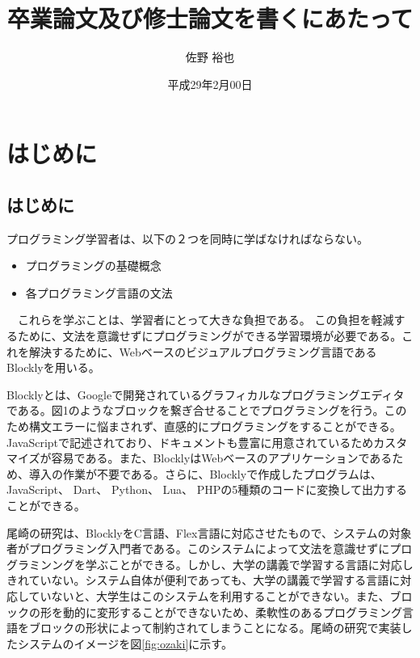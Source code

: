 \documentclass{eniepaper}
\title {卒業論文及び修士論文を書くにあたって}
\author{佐野 裕也}
\date{平成29年2月00日}
\begin{document}
 
\maketitle
                                                          
   \chapter{はじめに}
   
   \section{はじめに}


  プログラミング学習者は、以下の２つを同時に学ばなければならない。
  
\begin{itemize}
\item プログラミングの基礎概念
\item 各プログラミング言語の文法
\end{itemize} 

　これらを学ぶことは、学習者にとって大きな負担である。
 この負担を軽減するために、文法を意識せずにプログラミングができる学習環境が必要である。これを解決するために、Webベースのビジュアルプログラミング言語であるBlocklyを用いる。
  
Blocklyとは、Googleで開発されているグラフィカルなプログラミングエディタである。図1のようなブロックを繋ぎ合せることでプログラミングを行う。このため構文エラーに悩まされず、直感的にプログラミングをすることができる。JavaScriptで記述されており、ドキュメントも豊富に用意されているためカスタマイズが容易である。また、BlocklyはWebベースのアプリケーションであるため、導入の作業が不要である。さらに、Blocklyで作成したプログラムは、JavaScript、 Dart、 Python、 Lua、 PHPの5種類のコードに変換して出力することができる。

\newpage
 
尾崎の研究は、BlocklyをC言語、Flex言語に対応させたもので、システムの対象者がプログラミング入門者である。このシステムによって文法を意識せずにプログラミンングを学ぶことができる。しかし、大学の講義で学習する言語に対応しきれていない。システム自体が便利であっても、大学の講義で学習する言語に対応していないと、大学生はこのシステムを利用することができない。また、ブロックの形を動的に変形することができないため、柔軟性のあるプログラミング言語をブロックの形状によって制約されてしまうことになる。尾崎の研究で実装したシステムのイメージを図\ref{fig:ozaki}に示す。
 
\end{document}
